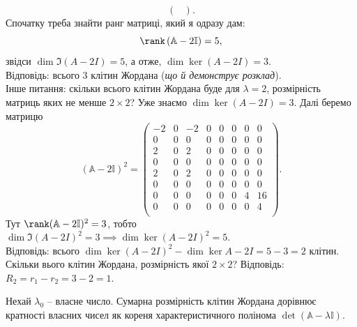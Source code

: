 \documentclass{math_library}
\begin{document}
\begin{example}
\[\begin{pmatrix}
\end{pmatrix}.
\]
Спочатку треба знайти ранг матриці, який я одразу дам: 
\[
\rank \left(\mathbb{A}-2 \mathbb{I} \right) = 5,
\]
звідси $\dim \Im (A-2I) = 5$, а отже, $\dim \ker (A-2I) = 3$.\\
Відповідь: всього 3 клітин Жордана (\textit{що й демонструє розклад}).
\bigskip \\
Інше питання: скільки всього клітин Жордана буде для $\lambda = 2$, розмірність матриць яких не менше $2 \times 2$? Уже знаємо $\dim \ker (A-2I) = 3$. Далі беремо матрицю 
\[
(\mathbb{A} - 2 \mathbb{I})^2 = \begin{pmatrix}
-2 & 0 & -2 & 0 & 0 & 0 & 0 & 0 \\
0 & 0 & 0 & 0 & 0 & 0 & 0 & 0 \\
2 & 0 & 2 & 0 & 0 & 0 & 0 & 0 \\
0 & 0 & 0 & 0 & 0 & 0 & 0 & 0 \\
2 & 0 & 2 & 0 & 0 & 0 & 0 & 0 \\
0 & 0 & 0 & 0 & 0 & 0 & 0 & 0 \\
0 & 0 & 0 & 0 & 0 & 0 & 4 & 16 \\
0 & 0 & 0 & 0 & 0 & 0 & 0 & 4 \\
\end{pmatrix}.
\] Тут $\rank (\mathbb{A}-2 \mathbb{I})^2 = 3$, тобто $\dim \Im (A-2 I)^2 = 3 \implies \dim \ker (A-2I)^2 = 5$.\\
Відповідь: всього $\dim \ker (A-2I)^2 - \dim \ker A-2I = 5 - 3 = 2$ клітин.
\bigskip \\
Скільки вього клітин Жордана, розмірність якої $2 \times 2$? Відповідь: $R_2 = r_1 - r_2 = 3 - 2 = 1$.
\end{example}
\iffalse

\begin{proposition}
Нехай $\lambda_0$ -- власне число. Сумарна розмірність клітин Жордана дорівнює кратності власних чисел як кореня характеристичного полінома $\det (\mathbb{A} - \lambda \mathbb{I})$.
\end{proposition}
\end{document}

